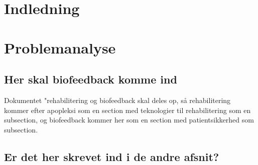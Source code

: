 





\frontmatter




 

 \cleardoublepage

\tableofcontents*

\mainmatter
\chapter{Indledning}



\chapter{Problemanalyse}







\section{Her skal biofeedback komme ind} 
Dokumentet "rehabilitering og biofeedback skal deles op, så rehabilitering kommer efter apopleksi som en section med teknologier til rehabilitering som en subsection, og biofeedback kommer her som en section med patientsikkerhed som subsection.

\section{Er det her skrevet ind i de andre afsnit?}



\clearpage
%
%


